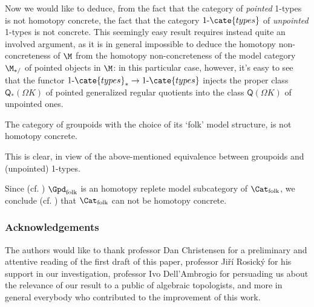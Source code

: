 Now we would like to deduce, from the fact that the category of \emph{pointed} 1-types is not homotopy concrete, the fact that the category $1\text{-}\cate{types}$ of \emph{unpointed} 1-types is not concrete. This seemingly easy result requires instead quite an involved argument, as it is in general impossible to deduce the homotopy non-concreteness of $\M$ from the homotopy non-concreteness of the model category $\M_{*/}$ of pointed objects in $\M$: in this particular case, however, it's easy to see that the functor $1\text{-}\cate{types}_* \to 1\text{-}\cate{types}$ injects the proper class $\mathsf{Q}_*(\Omega K)$ of pointed generalized regular quotients into the class $\mathsf{Q}(\Omega K)$ of unpointed ones.
\begin{corollary}
The category of groupoids with the choice of its `folk' model structure, is not homotopy concrete.%
\end{corollary}
This is clear, in view of the above-mentioned equivalence between groupoids and (unpointed) 1-types.
\begin{corollary}
Since (cf. ) $\Gpd_\text{folk}$ is an homotopy replete model subcategory of $\Cat_\text{folk}$, we conclude (cf. ) that $\Cat_\text{folk}$ can not be homotopy concrete.
\end{corollary}

\subsubsection*{Acknowledgements}
The authors would like to thank professor Dan Christensen for a preliminary and attentive reading of the first draft of this paper, professor Jiří Rosický for  his support in our investigation, professor Ivo Dell'Ambrogio for persuading us about the relevance of our result to a public of algebraic topologists, and more in general everybody who contributed to the improvement of this work.
